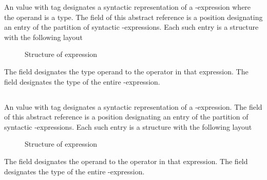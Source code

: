 An  value with tag  designates a syntactic representation
of a -expression where the operand is a type.
The  field of this abstract reference is a position designating an entry of the partition
of syntactic -expressions.  Each such entry is a structure with the following layout
%
\begin{figure}[H]
	\centering
	\caption{Structure of  expression}
	\label{fig:ifc:ExprSort:SizeofType}
\end{figure}
%
The  field designates the type operand to the  operator in that expression.
The  field designates the type of the entire -expression.




\subsection{}
\label{sec:ifc:ExprSort:Alignof}

An  value with tag  designates a syntactic representation
of a -expression.
The  field of this abstract reference is a position designating an entry of the partition
of syntactic -expressions.  Each such entry is a structure with the following layout
%
\begin{figure}[H]
	\centering
	\caption{Structure of  expression}
	\label{fig:ifc:ExprSort:Alignof}
\end{figure}

The  field designates the operand to the  operator in that expression.
The  field designates the type of the entire -expression.



